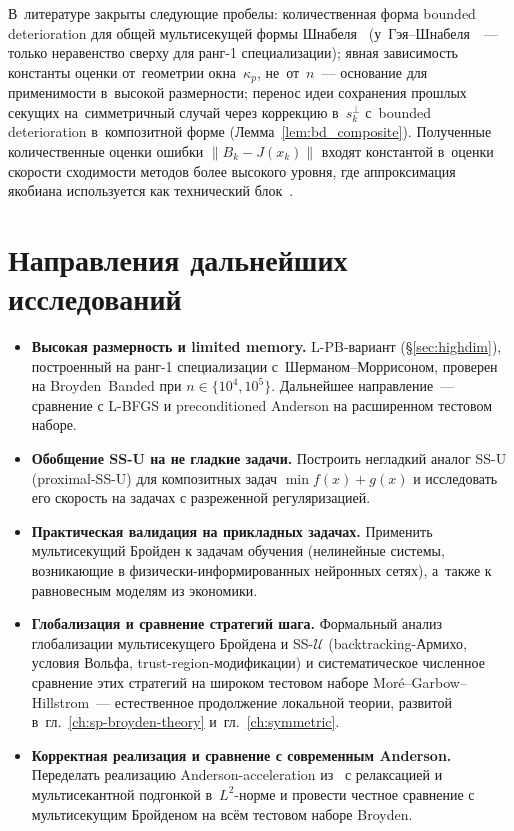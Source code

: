 В~литературе закрыты следующие пробелы: количественная форма bounded
deterioration для общей мультисекущей формы Шнабеля~\cite{schnabel1983}
(у~Гэя--Шнабеля~\cite{gay_schnabel1978}~--- только неравенство сверху
для ранг-1 специализации); явная зависимость константы оценки от~геометрии
окна~$\kappa_p$, не~от~$n$~--- основание для применимости в~высокой
размерности; перенос идеи сохранения прошлых секущих на~симметричный
случай через коррекцию в~$s_k^\perp$ с~bounded deterioration в~композитной
форме (Лемма~\ref{lem:bd_composite}). Полученные количественные оценки
ошибки $\|B_k - J(x_k)\|$ входят константой в~оценки скорости
сходимости методов более высокого уровня, где аппроксимация якобиана
используется как технический блок~\cite{viqa2024}.

\section*{Направления дальнейших исследований}

\begin{itemize}[leftmargin=*]
  \item \textbf{Высокая размерность и limited memory.}
        L-PB-вариант (\S\ref{sec:highdim}), построенный на
        ранг-1 специализации с~Шерманом--Моррисоном, проверен на
        Broyden~Banded при $n\in\{10^4, 10^5\}$. Дальнейшее
        направление~--- сравнение с L-BFGS и preconditioned Anderson
        на расширенном тестовом наборе.
  \item \textbf{Обобщение SS-U на не гладкие задачи.}
        Построить негладкий аналог SS-U (proximal-SS-U) для
        композитных задач $\min f(x) + g(x)$ и исследовать его
        скорость на задачах с разреженной регуляризацией.
  \item \textbf{Практическая валидация на прикладных задачах.}
        Применить мультисекущий Бройден к задачам
        обучения (нелинейные системы, возникающие в
        физически-информированных нейронных сетях), а~также к
        равновесным моделям из экономики.
  \item \textbf{Глобализация и сравнение стратегий шага.}
        Формальный анализ глобализации мультисекущего Бройдена и
        SS-$\mathcal{U}$ (backtracking-Армихо, условия Вольфа,
        trust-region-модификации) и систематическое численное
        сравнение этих стратегий на широком тестовом наборе
        Mor\'e--Garbow--Hillstrom~--- естественное продолжение
        локальной теории, развитой в~гл.~\ref{ch:sp-broyden-theory}
        и~гл.~\ref{ch:symmetric}.
  \item \textbf{Корректная реализация и сравнение с современным Anderson.}
        Переделать реализацию Anderson-acceleration из~\cite{walker2011}
        с релаксацией и мультисекантной подгонкой в~$L^2$-норме и
        провести честное сравнение с мультисекущим Бройденом на всём
        тестовом наборе Broyden.
\end{itemize}
